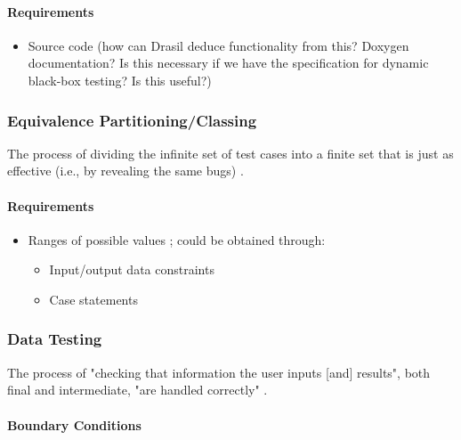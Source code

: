 \paragraph{Requirements}
\begin{itemize}
      \item Source code \cite[p.~65]{patton_software_2006} (how can Drasil
            deduce functionality from this? Doxygen documentation? Is this
            necessary if we have the specification for dynamic black-box
            testing? Is this useful?)
\end{itemize}

\subsubsection{Equivalence Partitioning/Classing \cite[p.~67-69]{patton_software_2006}}

The process of dividing the infinite set of test cases into a finite set that is
just as effective (i.e., by revealing the same bugs) \cite[p.~67]{patton_software_2006}.

\paragraph{Requirements}
\begin{itemize}
      \item Ranges of possible values \cite[p.~67]{patton_software_2006};
            could be obtained through:
            \begin{itemize}
                  \item Input/output data constraints
                  \item Case statements
            \end{itemize}
\end{itemize}

\subsubsection{Data Testing \cite[p.~70-79]{patton_software_2006}}

The process of "checking that information the user inputs [and] results",
both final and intermediate, "are handled correctly" \cite[p.~70]{patton_software_2006}.

\paragraph{Boundary Conditions \cite[p.~70-74]{patton_software_2006}}

